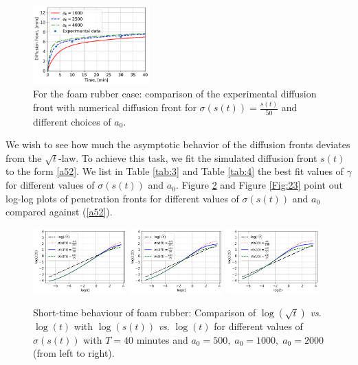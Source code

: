 \documentclass{article}
\begin{document}
\begin{figure}[h!]
	\centering
	\includegraphics[width=0.40\textwidth]{Foam_CombinedMV_Sigma_002.png}
	\caption{For the foam rubber case: comparison of the experimental diffusion front with  numerical  diffusion front  for $\sigma(s(t)) = \frac{s(t)}{50}$ and different choices of $a_0$.}
	\label{Fig:21}
\end{figure} 

We wish to see how much the asymptotic behavior of the diffusion fronts deviates from the $\sqrt{t}$-law.   To achieve this task, we  fit the simulated diffusion front  $s(t)$   to the form \eqref{a52}.
 We list in Table \ref{tab:3} and Table \ref{tab:4} the best fit values of $\gamma$ for different values of $\sigma(s(t))$ and $a_0$. Figure \ref{Fig:22} and Figure \ref{Fig:23} point out log-log plots of penetration fronts for different values of $\sigma(s(t))$ and $a_0$ compared against (\ref{a52}). 

\begin{figure}[h!]
	\centering
	\includegraphics[width=0.32\textwidth]{Foam_Loglog_a0_500.png}
	\hspace{0.1cm}
	\includegraphics[width=0.32\textwidth]{Foam_Loglog_a0_1000.png}
	\hspace{0.1cm}
	\includegraphics[width=0.32\textwidth]{Foam_Loglog_a0_2000.png}
	\caption{Short-time behaviour of  foam rubber: Comparison of $\log(\sqrt{t})$ \textit{vs}. $\log(t)$ with  $\log(s(t))$ \textit{vs}. $\log(t)$ for different values of $\sigma(s(t))$ with $T = 40$ minutes and  $a_0 = 500, \;a_0 =  1000, \;a_0 =  2000$ (from left to right).}
	\label{Fig:22}
\end{figure}
\end{document}
